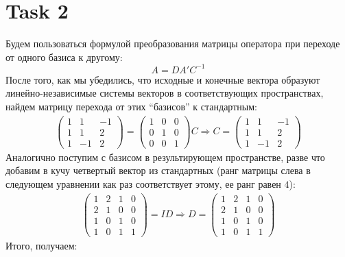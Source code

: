 \section{Task 2}
Будем пользоваться формулой преобразования матрицы оператора при переходе от одного базиса к другому:
\begin{equation}
    A = DA'C^{-1}
\end{equation}
После того, как мы убедились, что исходные и конечные вектора образуют линейно-независимые системы векторов в соответствующих пространствах, найдем матрицу перехода от этих ``базисов'' к стандартным:
\begin{gather}
    \begin{pmatrix}
        1 &  1 & -1 \\
        1 &  1 &  2 \\
        1 & -1 &  2 
    \end{pmatrix} = 
    \begin{pmatrix}
        1 & 0 & 0 \\
        0 & 1 & 0 \\
        0 & 0 & 1
    \end{pmatrix}C\Longrightarrow C = 
    \begin{pmatrix}
        1 &  1 & -1 \\
        1 &  1 &  2 \\
        1 & -1 &  2
    \end{pmatrix}
\end{gather}
Аналогично поступим с базисом в результирующем пространстве, разве что добавим в кучу четвертый вектор из стандартных (ранг матрицы слева в следующем уравнении как раз соответствует этому, ее ранг равен $4$):
\begin{gather}
    \begin{pmatrix}
        1 & 2 & 1 & 0 \\
        2 & 1 & 0 & 0 \\
        1 & 0 & 1 & 0 \\
        1 & 0 & 1 & 1 
    \end{pmatrix} = ID \Longrightarrow D = 
    \begin{pmatrix}
        1 & 2 & 1 & 0 \\
        2 & 1 & 0 & 0 \\
        1 & 0 & 1 & 0 \\
        1 & 0 & 1 & 1 
    \end{pmatrix}
\end{gather}
Итого, получаем:
